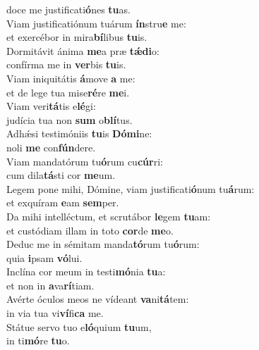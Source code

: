 \evenverse doce me justificati\textbf{ó}nes \textbf{tu}as.\\
\oddverse Viam justificatiónum tuárum \textbf{ín}stru\textbf{e} me:~\*\\
\oddverse et exercébor in mira\textbf{bí}libus \textbf{tu}is.\\
\evenverse Dormitávit ánima \textbf{me}a præ \textbf{tǽ}\textbf{di}o:~\*\\
\evenverse confírma me in \textbf{ver}bis \textbf{tu}is.\\
\oddverse Viam iniquitátis \textbf{á}move \textbf{a} me:~\*\\
\oddverse et de lege tua mise\textbf{ré}re \textbf{me}i.\\
\evenverse Viam veri\textbf{tá}tis e\textbf{lé}gi:~\*\\
\evenverse judícia tua non \textbf{sum} o\textbf{blí}tus.\\
\oddverse Adhǽsi testimóniis \textbf{tu}is \textbf{Dó}\textbf{mi}ne:~\*\\
\oddverse noli \textbf{me} con\textbf{fún}dere.\\
\evenverse Viam mandatórum tu\textbf{ó}rum cu\textbf{cúr}ri:~\*\\
\evenverse cum dila\textbf{tá}sti cor \textbf{me}um.\\
\oddverse Legem pone mihi, Dómine, viam justificati\textbf{ó}num tu\textbf{á}rum:~\*\\
\oddverse et exquíram \textbf{e}am \textbf{sem}per.\\
\evenverse Da mihi intelléctum, et scrutábor \textbf{le}gem \textbf{tu}am:~\*\\
\evenverse et custódiam illam in toto \textbf{cor}de \textbf{me}o.\\
\oddverse Deduc me in sémitam manda\textbf{tó}rum tu\textbf{ó}rum:~\*\\
\oddverse quia \textbf{i}psam \textbf{vó}lui.\\
\evenverse Inclína cor meum in testi\textbf{mó}nia \textbf{tu}a:~\*\\
\evenverse et non in \textbf{a}va\textbf{rí}tiam.\\
\oddverse Avérte óculos meos ne vídeant \textbf{va}ni\textbf{tá}tem:~\*\\
\oddverse in via tua vi\textbf{ví}fi\textbf{ca} me.\\
\evenverse Státue servo tuo e\textbf{ló}quium \textbf{tu}um,~\*\\
\evenverse in ti\textbf{mó}re \textbf{tu}o.\\
